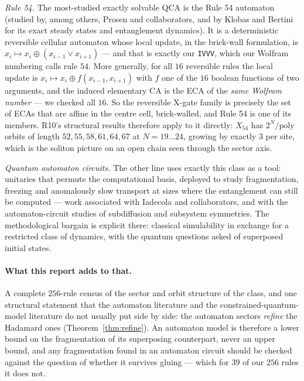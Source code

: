 \documentclass[11pt]{article}
\newcommand{\rt}[1]{\texttt{#1}}
\theoremstyle{plain}
\theoremstyle{remark}
\begin{document}
\emph{Rule 54.} The most-studied exactly solvable QCA is the Rule 54 automaton
(studied by, among others, Prosen and collaborators, and by Klobas and Bertini for
its exact steady states and entanglement dynamics). It is a deterministic
reversible cellular automaton whose local update, in the brick-wall formulation,
is $x_i\mapsto x_i\oplus(x_{i-1}\vee x_{i+1})$ --- and that is exactly our
\rt{IVVV}, which our Wolfram numbering calls rule $54$. More generally, for all
$16$ reversible rules the local update is $x_i\mapsto x_i\oplus f(x_{i-1},x_{i+1})$
with $f$ one of the $16$ boolean functions of two arguments, and the induced
elementary CA is the ECA of the \emph{same Wolfram number} --- we checked all $16$.
So the reversible X-gate family is precisely the set of ECAs that are affine in
the centre cell, brick-walled, and Rule 54 is one of its members. R10's structural
results therefore apply to it directly: $X_{54}$ has $2^N/\mathrm{poly}$ orbits of
length $52,55,58,61,64,67$ at $N=19\ldots24$, growing by exactly $3$ per site,
which is the soliton picture on an open chain seen through the sector axis.

\emph{Quantum automaton circuits.} The other line uses exactly this class as a
tool: unitaries that permute the computational basis, deployed to study
fragmentation, freezing and anomalously slow transport at sizes where the
entanglement can still be computed --- work associated with Iadecola and
collaborators, and with the automaton-circuit studies of subdiffusion and
subsystem symmetries. The methodological bargain is explicit there: classical
simulability in exchange for a restricted class of dynamics, with the quantum
questions asked of superposed initial states.

\paragraph{What this report adds to that.} A complete $256$-rule census of the
sector and orbit structure of the class, and one structural statement that the
automaton literature and the constrained-quantum-model literature do not usually
put side by side: the automaton sectors \emph{refine} the Hadamard ones
(Theorem~\ref{thm:refine}). An automaton model is therefore a lower bound on the
fragmentation of its superposing counterpart, never an upper bound, and any
fragmentation found in an automaton circuit should be checked against the
question of whether it survives gluing --- which for $39$ of our $256$ rules it
does not.
\end{document}
